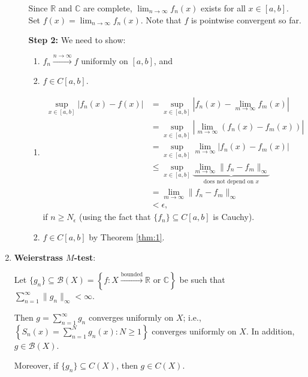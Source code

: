 \documentclass[letterpaper, reqno,11pt]{article}
\newcommand{\RR}{\mathbb{R}}
\newcommand{\CC}{\mathbb{C}}
\begin{document}
\begin{enumerate}
\begin{enumerate}
    Since $\RR$ and $\CC$ are complete, $\lim_{n \to \infty} f_n(x)$ exists for all $x \in [a, b]$. Set $f(x) = \lim_{n \to \infty} f_n(x)$. Note that $f$ is pointwise convergent so far.
  \item[{\bf Step 2:}] We need to show:
    \begin{enumerate}
    \item $f_n \xrightarrow{n \to \infty} f$ uniformly on $[a, b]$, and
    \item $f \in C[a, b]$.
    \end{enumerate}
    \begin{enumerate}
    \item
      \begin{align*}
        \sup_{x \in [a, b]} |f_n(x) - f(x)| &= \sup_{x \in [a, b]} \left|f_n(x) - \lim_{m \to \infty} f_m(x)\right| \\
        &= \sup_{x \in [a, b]} \left|\lim_{m \to \infty} (f_n(x) - f_m(x))\right| \\
        &= \sup_{x \in [a, b]} \lim_{m \to \infty} |f_n(x) - f_m(x)| \\
        &\leq \sup_{x \in [a, b]} \underbrace{\lim_{m \to \infty} \lVert f_n - f_m \rVert_\infty}_\text{does not depend on $x$} \\
        &= \lim_{m \to \infty} \lVert f_n - f_m \rVert_\infty \\
        &< \epsilon,
      \end{align*}
      if $n \geq N_\epsilon$ (using the fact that $\{ f_n \} \subseteq C[a, b]$ is Cauchy).
    \item $f \in C[a, b]$ by Theorem \ref{thm:1}.
    \end{enumerate}
  \end{enumerate}
\item {\bf Weierstrass $M$-test}:

  Let $\{ g_n \} \subseteq \mathcal B(X) = \left\{ f : X \xrightarrow{\text{bounded}} \RR \text{ or } \CC \right\}$ be such that $\sum_{n = 1}^\infty \lVert g_n \rVert_\infty < \infty$.

  Then $g = \sum_{n = 1}^\infty g_n$ converges uniformly on $X$; i.e., $\left\{ S_n(x) = \sum_{n = 1}^N g_n(x) : N \geq 1 \right\}$ converges uniformly on $X$. In addition, $g \in \mathcal B(X)$.

  Moreover, if $\{ g_n \} \subseteq C(X)$, then $g \in C(X)$.
\end{enumerate}
\end{document}
